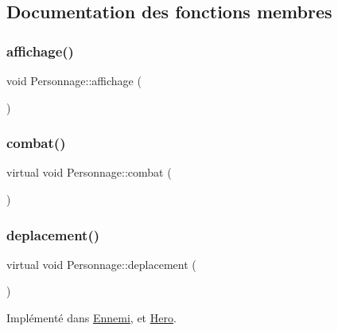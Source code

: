 \subsection{Documentation des fonctions membres}
\mbox{\label{classPersonnage_a4c09f145cfa8e318d7c9521cf70dc82c}} 
\subsubsection{\texorpdfstring{affichage()}{affichage()}}
{\footnotesize\ttfamily void Personnage\+::affichage (\begin{DoxyParamCaption}{ }\end{DoxyParamCaption})}

\mbox{\label{classPersonnage_a42306b5ce866d7e243988f7c74a0e863}} 
\subsubsection{\texorpdfstring{combat()}{combat()}}
{\footnotesize\ttfamily virtual void Personnage\+::combat (\begin{DoxyParamCaption}{ }\end{DoxyParamCaption})\hspace{0.3cm}{\ttfamily [virtual]}}

\mbox{\label{classPersonnage_afb4a375fa5494eb586b9470d72a46694}} 
\subsubsection{\texorpdfstring{deplacement()}{deplacement()}}
{\footnotesize\ttfamily virtual void Personnage\+::deplacement (\begin{DoxyParamCaption}{ }\end{DoxyParamCaption})\hspace{0.3cm}{\ttfamily [pure virtual]}}



Implémenté dans \hyperlink{classEnnemi_a6d60d6fed98ea6fe501484a693d163a9}{Ennemi}, et \hyperlink{classHero_a0429397b47b0d3969c4e30cc5bdee250}{Hero}.

